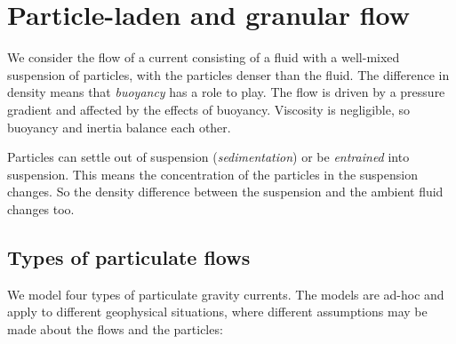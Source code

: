 \section{Particle-laden and granular flow}

We consider the flow of a current consisting of a fluid with a well-mixed
suspension of particles, with the particles denser than the fluid. The
difference in density means that \textit{buoyancy} has a role to play. The flow is
driven by a pressure gradient and affected by the effects of buoyancy. Viscosity
is negligible, so buoyancy and inertia balance each other. 

Particles can settle out of suspension (\textit{sedimentation}) or be \textit{entrained}
into suspension. This means the concentration of the particles in the suspension
changes. So the density difference between the suspension and the ambient fluid
changes too. 

\subsection{Types of particulate flows}

We model four types of particulate gravity currents. The models are ad-hoc and
apply to different geophysical situations, where different assumptions may be
made about the flows and the particles:

